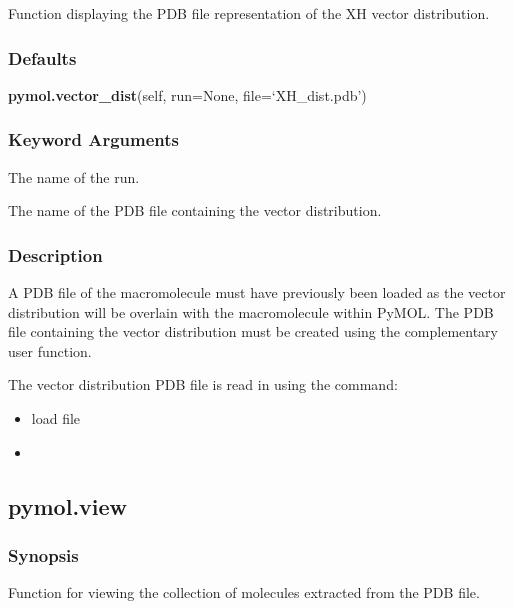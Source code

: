  Function displaying the PDB file representation of the XH vector distribution. 
  

  
 \subsubsection{Defaults} 

 \textsf{\textbf{pymol.vector\_dist}(self, run=None, file=`XH\_dist.pdb')} 

  
 \subsubsection{Keyword Arguments} 

   The name of the run.   

   The name of the PDB file containing the vector distribution.  

  

  
 \subsubsection{Description} 

 A PDB file of the macromolecule must have previously been loaded as the vector distribution will be overlain with the macromolecule within PyMOL.  The PDB file containing the vector distribution must be created using the complementary  user function. 
  

 The vector distribution PDB file is read in using the command: 
  

 \begin{itemize} 
 \item[] load file  
 \item[]  
 \end{itemize} 
  

  

 \newpage 

 \subsection{pymol.view} 

  
 \subsubsection{Synopsis} 

 Function for viewing the collection of molecules extracted from the PDB file. 
  

